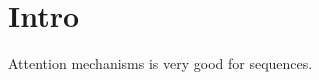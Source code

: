 \documentclass{article}
\begin{document}
\section{Intro}\label{sec:intro}

Attention mechanisms is very good for sequences.
\end{document}
